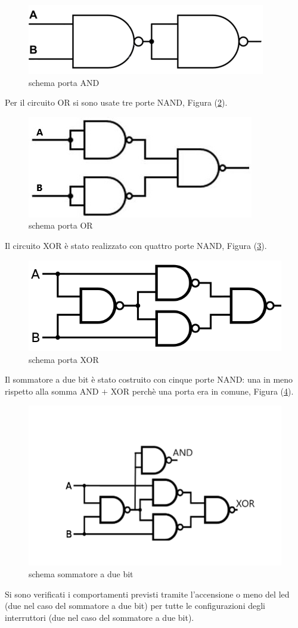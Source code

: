 \documentclass[10pt,a4paper]{article}
\begin{document}
\begin{figure}
			\centering
			\includegraphics[scale=0.60]{and}
			\caption{schema porta AND}
			\label{fig:and}
\end{figure}
Per il circuito OR  si sono usate tre porte NAND, Figura (\ref{fig:or}).
\begin{figure}
			\centering
			\includegraphics[scale=0.85]{or}
			\caption{schema porta OR}
			\label{fig:or}
\end{figure}
Il circuito XOR  è stato realizzato con quattro porte NAND, Figura (\ref{fig:xor}).
\begin{figure}
			\centering
			\includegraphics[scale=0.55]{xor}
			\caption{schema porta XOR}
			\label{fig:xor}
\end{figure}
Il sommatore a due bit è stato costruito con cinque porte NAND: una in meno rispetto alla somma AND $+$  XOR perchè una porta era in comune, Figura (\ref{fig:som}).
\begin{figure}
			\centering
			\includegraphics[scale=0.55]{sommatore}
			\caption{schema sommatore a due bit}
			\label{fig:som}
\end{figure}

Si sono verificati i comportamenti  previsti tramite l'accensione o meno del led  (due nel caso del sommatore a due bit) per tutte le configurazioni degli interruttori (due nel caso del sommatore a due bit).
\end{document}
